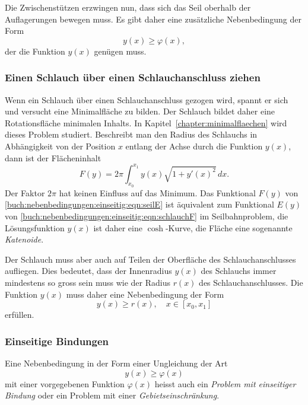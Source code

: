 Die Zwischenstützen erzwingen nun, dass sich das Seil oberhalb der 
Auflagerungen bewegen muss.
Es gibt daher eine zusätzliche Nebenbedingung der Form
\[
y(x) \ge \varphi(x),
\]
der die Funktion $y(x)$ genügen muss.

%
%
\subsubsection{Einen Schlauch über einen Schlauchanschluss ziehen}
Wenn ein Schlauch über einen Schlauchanschluss gezogen wird, spannt
er sich und versucht eine Minimalfläche zu bilden.
Der Schlauch bildet daher eine Rotationsfläche minimalen Inhalts.
In Kapitel~\ref{chapter:minimalflaechen} wird dieses Problem 
studiert.
Beschreibt man den Radius des Schlauchs in Abhängigkeit von der
Position $x$ entlang der Achse durch die Funktion $y(x)$, dann ist
der Flächeninhalt
\begin{equation}
F(y)
=
2\pi
\int_{x_0}^{x_1}
y(x)\sqrt{1+y'(x)^2}\,dx.
\label{buch:nebenbedingungen:einseitig:eqn:schlauchF}
\end{equation}
Der Faktor $2\pi$ hat keinen Einfluss auf das Minimum.
Das Funktional $F(y)$ von
\eqref{buch:nebenbedingungen:einseitig:eqn:seilE}
ist äquivalent zum Funktional $E(y)$ von
\eqref{buch:nebenbedingungen:einseitig:eqn:schlauchF}
im Seilbahnproblem,
die Lösungsfunktion $y(x)$ ist daher eine $\cosh$-Kurve,
die Fläche eine sogenannte {\em Katenoide}.

Der Schlauch muss aber auch auf Teilen der Oberfläche des
Schlauchanschlusses aufliegen.
Dies bedeutet, dass der Innenradius $y(x)$ des Schlauchs immer
mindestens so gross sein muss wie der Radius $r(x)$ des Schlauchanschlusses.
Die Funktion $y(x)$ muss daher eine Nebenbedingung der Form
\[
y(x) \ge r(x),\quad x\in[x_0,x_1]
\]
erfüllen.

%
%
\subsubsection{Einseitige Bindungen}
Eine Nebenbedingung in der Form einer Ungleichung der Art
\[
y(x) \ge \varphi(x)
\]
mit einer vorgegebenen Funktion $\varphi(x)$ heisst auch
ein {\em Problem mit einseitiger Bindung}
%
%
oder ein Problem mit einer {\em Gebietseinschränkung}.
%

%
%
